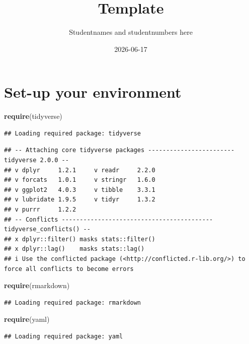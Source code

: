 \documentclass[
]{article}
\title{Template}
\author{Studentnames and studentnumbers here}
\date{2026-06-17}
\newenvironment{Shaded}{\begin{snugshade}}{\end{snugshade}}
\newcommand{\FunctionTok}[1]{\textcolor[rgb]{0.13,0.29,0.53}{\textbf{#1}}}
\newcommand{\NormalTok}[1]{#1}
\begin{document}
\maketitle

\section{Set-up your environment}\label{set-up-your-environment}

\begin{Shaded}
\begin{Highlighting}[]
\FunctionTok{require}\NormalTok{(tidyverse)}
\end{Highlighting}
\end{Shaded}

\begin{verbatim}
## Loading required package: tidyverse
\end{verbatim}

\begin{verbatim}
## -- Attaching core tidyverse packages ------------------------ tidyverse 2.0.0 --
## v dplyr     1.2.1     v readr     2.2.0
## v forcats   1.0.1     v stringr   1.6.0
## v ggplot2   4.0.3     v tibble    3.3.1
## v lubridate 1.9.5     v tidyr     1.3.2
## v purrr     1.2.2     
## -- Conflicts ------------------------------------------ tidyverse_conflicts() --
## x dplyr::filter() masks stats::filter()
## x dplyr::lag()    masks stats::lag()
## i Use the conflicted package (<http://conflicted.r-lib.org/>) to force all conflicts to become errors
\end{verbatim}

\begin{Shaded}
\begin{Highlighting}[]
\FunctionTok{require}\NormalTok{(rmarkdown)}
\end{Highlighting}
\end{Shaded}

\begin{verbatim}
## Loading required package: rmarkdown
\end{verbatim}

\begin{Shaded}
\begin{Highlighting}[]
\FunctionTok{require}\NormalTok{(yaml)}
\end{Highlighting}
\end{Shaded}

\begin{verbatim}
## Loading required package: yaml
\end{verbatim}
\end{document}
